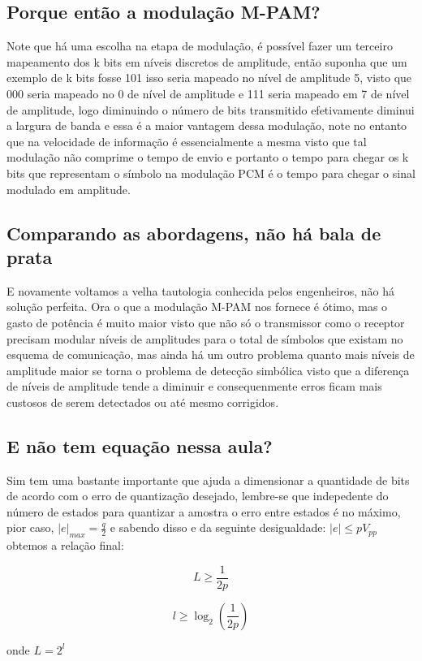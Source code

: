 \subsection{Porque então a modulação M-PAM?}

Note que há uma escolha na etapa de modulação, é possível fazer um terceiro mapeamento dos k bits em níveis discretos de amplitude, então suponha que um exemplo de k bits
fosse 101 isso seria mapeado no nível de amplitude 5, visto que 000 seria mapeado no 0 de nível de amplitude e 111 seria mapeado em 7 de nível de amplitude, logo diminuindo
o número de bits transmitido efetivamente diminui a largura de banda e essa é a maior vantagem dessa modulação, note no entanto que na velocidade de informação é essencialmente
a mesma visto que tal modulação não comprime o tempo de envio e portanto o tempo para chegar os k bits que representam o símbolo na modulação PCM é o tempo para chegar o sinal
modulado em amplitude.

\subsection{Comparando as abordagens, não há bala de prata }

E novamente voltamos a velha tautologia conhecida pelos engenheiros, não há solução perfeita. Ora o que a modulação M-PAM nos fornece é ótimo, mas o gasto de potência é muito maior
visto que não só o transmissor como o receptor precisam modular níveis de amplitudes para o total de símbolos que existam no esquema de comunicação, mas ainda há um outro problema
quanto mais níveis de amplitude maior se torna o problema de detecção simbólica visto que a diferença de níveis de amplitude tende a diminuir e consequenmente erros ficam mais custosos de serem detectados ou até mesmo corrigidos.

\subsection{E não tem equação nessa aula?}

Sim tem uma bastante importante que ajuda a dimensionar a quantidade de bits de acordo com o erro de quantização desejado, lembre-se que indepedente do número de estados para
quantizar a amostra o erro entre estados é no máximo, pior caso, $|e|_{max}=\frac{q}{2}$ e sabendo disso e da seguinte desigualdade: $|e| \le pV_{pp}$ obtemos a relação final:

\begin{equation}
	L \ge \frac{1}{2p}
\end{equation}

\begin{equation}
	l \ge \log_{2}(\frac{1}{2p})
\end{equation}

onde $L=2^{l}$

